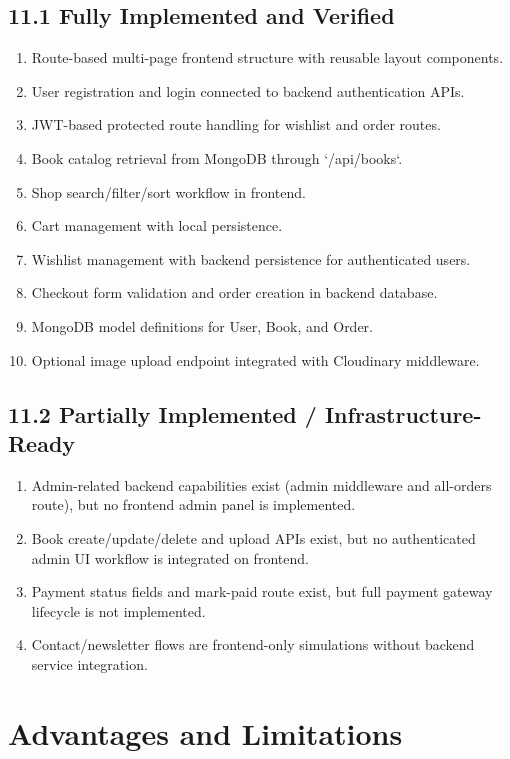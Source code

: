 \documentclass[12pt,a4paper]{report}
\begin{document}
\section*{11.1 Fully Implemented and Verified}
\begin{enumerate}[label=\arabic*.]
    \item Route-based multi-page frontend structure with reusable layout components.
    \item User registration and login connected to backend authentication APIs.
    \item JWT-based protected route handling for wishlist and order routes.
    \item Book catalog retrieval from MongoDB through `/api/books`.
    \item Shop search/filter/sort workflow in frontend.
    \item Cart management with local persistence.
    \item Wishlist management with backend persistence for authenticated users.
    \item Checkout form validation and order creation in backend database.
    \item MongoDB model definitions for User, Book, and Order.
    \item Optional image upload endpoint integrated with Cloudinary middleware.
\end{enumerate}

\section*{11.2 Partially Implemented / Infrastructure-Ready}
\begin{enumerate}[label=\arabic*.]
    \item Admin-related backend capabilities exist (admin middleware and all-orders route), but no frontend admin panel is implemented.
    \item Book create/update/delete and upload APIs exist, but no authenticated admin UI workflow is integrated on frontend.
    \item Payment status fields and mark-paid route exist, but full payment gateway lifecycle is not implemented.
    \item Contact/newsletter flows are frontend-only simulations without backend service integration.
\end{enumerate}

\chapter{Advantages and Limitations}
\end{document}

